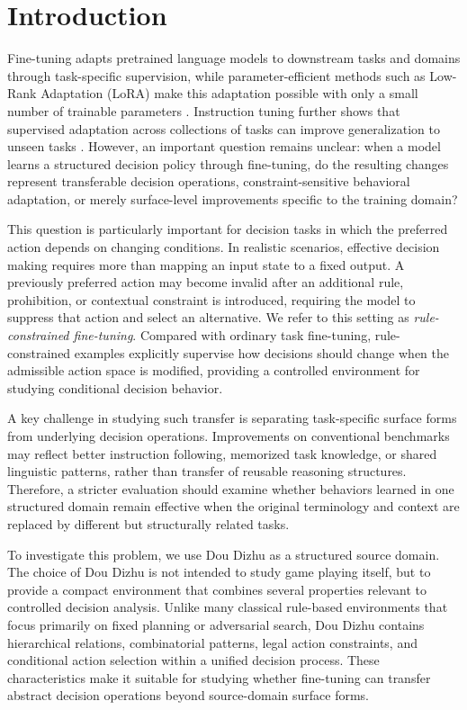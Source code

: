\section{Introduction}
\label{sec:introduction}

Fine-tuning adapts pretrained language models to downstream tasks and domains through task-specific supervision, while parameter-efficient methods such as Low-Rank Adaptation (LoRA) make this adaptation possible with only a small number of trainable parameters \cite{hu2022lora}. Instruction tuning further shows that supervised adaptation across collections of tasks can improve generalization to unseen tasks \cite{wei2022finetuned,chung2024scaling}. However, an important question remains unclear: when a model learns a structured decision policy through fine-tuning, do the resulting changes represent transferable decision operations, constraint-sensitive behavioral adaptation, or merely surface-level improvements specific to the training domain?

This question is particularly important for decision tasks in which the preferred action depends on changing conditions. In realistic scenarios, effective decision making requires more than mapping an input state to a fixed output. A previously preferred action may become invalid after an additional rule, prohibition, or contextual constraint is introduced, requiring the model to suppress that action and select an alternative. We refer to this setting as \emph{rule-constrained fine-tuning}. Compared with ordinary task fine-tuning, rule-constrained examples explicitly supervise how decisions should change when the admissible action space is modified, providing a controlled environment for studying conditional decision behavior.

A key challenge in studying such transfer is separating task-specific surface forms from underlying decision operations. Improvements on conventional benchmarks may reflect better instruction following, memorized task knowledge, or shared linguistic patterns, rather than transfer of reusable reasoning structures. Therefore, a stricter evaluation should examine whether behaviors learned in one structured domain remain effective when the original terminology and context are replaced by different but structurally related tasks.

To investigate this problem, we use Dou Dizhu as a structured source domain. The choice of Dou Dizhu is not intended to study game playing itself, but to provide a compact environment that combines several properties relevant to controlled decision analysis. Unlike many classical rule-based environments that focus primarily on fixed planning or adversarial search, Dou Dizhu contains hierarchical relations, combinatorial patterns, legal action constraints, and conditional action selection within a unified decision process. These characteristics make it suitable for studying whether fine-tuning can transfer abstract decision operations beyond source-domain surface forms.

